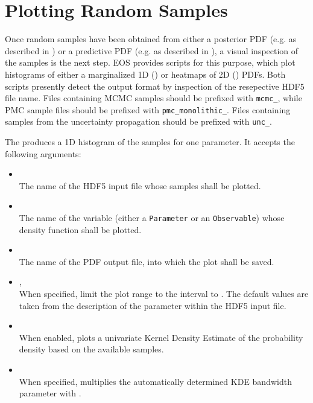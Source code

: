 \section{Plotting Random Samples}
\label{sec:usage:eos-plot}

Once random samples have been obtained from either a posterior PDF (e.g. as
described in ) or a predictive PDF (e.g. as
described in ), a visual inspection of
the samples is the next step.  EOS provides scripts for this purpose, which
plot histograms of either a marginalized 1D () or heatmaps
of 2D () PDFs.  Both scripts presently detect the output
format by inspection of the resepective HDF5 file name. Files containing MCMC
samples should be prefixed with \texttt{mcmc\_}, while PMC sample files should
be prefixed with \texttt{pmc\_monolithic\_}. Files containing samples from the
uncertainty propagation should be prefixed with \texttt{unc\_}.

The  produces a 1D histogram of the samples for one parameter.
It accepts the following arguments:
\begin{itemize}
    \item[] \\[\medskipamount]
        The name of the HDF5 input file whose samples shall be plotted.

    \item[] \\[\medskipamount]
        The name of the variable (either a \texttt{Parameter} or an \texttt{Observable}) whose
        density function shall be plotted.

    \item[] \\[\medskipamount]
        The name of the PDF output file, into which the plot shall be saved.

    \item[] , \\[\medskipamount]
        When specified, limit the plot range to the interval  to .
        The default values are taken from the description of the parameter within the
        HDF5 input file.

    \item[] \\[\medskipamount]
        When enabled, plots a univariate Kernel Density Estimate of the probability
        density based on the available samples.

    \item[] \\[\medskipamount]
        When specified, multiplies the automatically determined KDE bandwidth parameter
        with .
\end{itemize}

